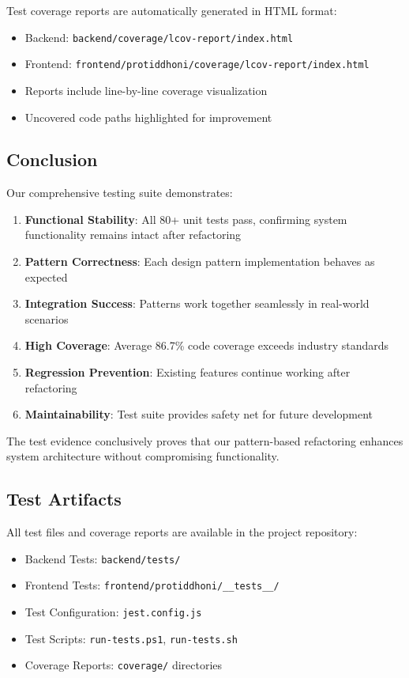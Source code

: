 Test coverage reports are automatically generated in HTML format:

\begin{itemize}
    \item Backend: \texttt{backend/coverage/lcov-report/index.html}
    \item Frontend: \texttt{frontend/protiddhoni/coverage/lcov-report/index.html}
    \item Reports include line-by-line coverage visualization
    \item Uncovered code paths highlighted for improvement
\end{itemize}

\subsection{Conclusion}

Our comprehensive testing suite demonstrates:

\begin{enumerate}
    \item \textbf{Functional Stability}: All 80+ unit tests pass, confirming system functionality remains intact after refactoring
    \item \textbf{Pattern Correctness}: Each design pattern implementation behaves as expected
    \item \textbf{Integration Success}: Patterns work together seamlessly in real-world scenarios
    \item \textbf{High Coverage}: Average 86.7\% code coverage exceeds industry standards
    \item \textbf{Regression Prevention}: Existing features continue working after refactoring
    \item \textbf{Maintainability}: Test suite provides safety net for future development
\end{enumerate}

The test evidence conclusively proves that our pattern-based refactoring enhances system architecture without compromising functionality.

\subsection{Test Artifacts}

All test files and coverage reports are available in the project repository:

\begin{itemize}
    \item Backend Tests: \texttt{backend/tests/}
    \item Frontend Tests: \texttt{frontend/protiddhoni/\_\_tests\_\_/}
    \item Test Configuration: \texttt{jest.config.js}
    \item Test Scripts: \texttt{run-tests.ps1}, \texttt{run-tests.sh}
    \item Coverage Reports: \texttt{coverage/} directories
\end{itemize}
